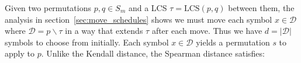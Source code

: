 \documentclass{siamart190516}
\begin{document}
Given two permutations $p,q \in S_m$ and a LCS $\tau = \mathrm{LCS}(p,q)$ between them, the analysis in section~\ref{sec:move_schedules} shows we must move each symbol $x \in \mathcal{D}$ where $\mathcal{D} = p \smallsetminus \tau$ in a way that extends $\tau$ after each move. Thus we have $d = \lvert \mathcal{D} \rvert$ symbols to choose from initially. Each symbol $x \in \mathcal{D}$ yields a permutation $s$ to apply to $p$. Unlike the Kendall distance, the Spearman distance satisfies: 
\end{document}
